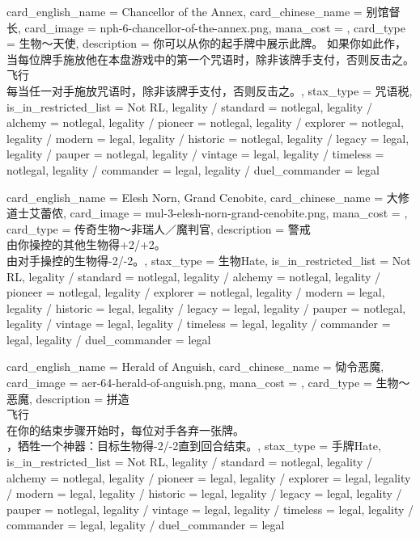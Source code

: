 \documentclass[lang = cn, color = black, 10pt]{AllThatStax}
\begin{document}
\card
{
	card_english_name = {Chancellor of the Annex},
	card_chinese_name = {别馆督长},
	card_image = nph-6-chancellor-of-the-annex.png,
	mana_cost = ,
	card_type = 生物～天使,
	description = {你可以从你的起手牌中展示此牌。 如果你如此作，当每位牌手施放他在本盘游戏中的第一个咒语时，除非该牌手支付，否则反击之。\\
飞行\\
每当任一对手施放咒语时，除非该牌手支付，否则反击之。},
	stax_type = 咒语税,
	is_in_restricted_list = Not RL,
	legality / standard = notlegal,
	legality / alchemy = notlegal,
	legality / pioneer = notlegal,
	legality / explorer = notlegal,
	legality / modern = legal,
	legality / historic = notlegal,
	legality / legacy = legal,
	legality / pauper = notlegal,
	legality / vintage = legal,
	legality / timeless = notlegal,
	legality / commander = legal,
	legality / duel_commander = legal
}

\card
{
	card_english_name = {Elesh Norn, Grand Cenobite},
	card_chinese_name = {大修道士艾蕾侬},
	card_image = mul-3-elesh-norn-grand-cenobite.png,
	mana_cost = ,
	card_type = 传奇生物～非瑞人／魔判官,
	description = {警戒\\
由你操控的其他生物得+2/+2。\\
由对手操控的生物得-2/-2。},
	stax_type = 生物Hate,
	is_in_restricted_list = Not RL,
	legality / standard = notlegal,
	legality / alchemy = notlegal,
	legality / pioneer = notlegal,
	legality / explorer = notlegal,
	legality / modern = legal,
	legality / historic = legal,
	legality / legacy = legal,
	legality / pauper = notlegal,
	legality / vintage = legal,
	legality / timeless = legal,
	legality / commander = legal,
	legality / duel_commander = legal
}

\card
{
	card_english_name = {Herald of Anguish},
	card_chinese_name = {恸令恶魔},
	card_image = aer-64-herald-of-anguish.png,
	mana_cost = ,
	card_type = 生物～恶魔,
	description = {拼造\\
飞行\\
在你的结束步骤开始时，每位对手各弃一张牌。\\
，牺牲一个神器：目标生物得-2/-2直到回合结束。},
	stax_type = 手牌Hate,
	is_in_restricted_list = Not RL,
	legality / standard = notlegal,
	legality / alchemy = notlegal,
	legality / pioneer = legal,
	legality / explorer = legal,
	legality / modern = legal,
	legality / historic = legal,
	legality / legacy = legal,
	legality / pauper = notlegal,
	legality / vintage = legal,
	legality / timeless = legal,
	legality / commander = legal,
	legality / duel_commander = legal
}
\end{document}

